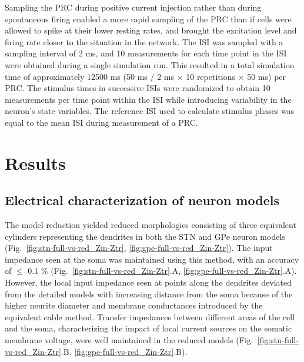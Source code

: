 Sampling the PRC during positive current injection rather than during spontaneous
firing enabled a more rapid sampling of the PRC than if cells were allowed to spike
at their lower resting rates, and brought the excitation level and firing rate closer
to the situation in the network.
%
The ISI was sampled with a sampling interval of 2 ms, and 10 measurements for each time
point in the ISI were obtained during a single simulation run.
This resulted in a total simulation time of approximately 12500 ms
(50 ms / 2 ms $\times$ 10 repetitions $\times$ 50 ms) per PRC. The stimulus times in
successive ISIs were randomized to obtain 10 measurements per
time point within the ISI while introducing variability in the neuron's state variables.
The reference ISI used to calculate stimulus phases was equal to the mean ISI
during measurement of a PRC.
%
%



%
%
%
\section{Results}

%
%
%
%

%
%
%
%
%
%
%

%
%
%
\subsection{Electrical characterization of neuron models}
%

%
%
%
%
%

%
%
%
%
%
%
%
%

The model reduction yielded reduced morphologies consisting of three equivalent
cylinders representing the dendrites in both the STN and GPe neuron models
(Fig.~\ref{fig:stn-full-vs-red_Zin-Ztr}, \ref{fig:gpe-full-vs-red_Zin-Ztr}).
The input impedance seen at the soma was maintained using this method,
with an accuracy of $\leq$ 0.1 \% (Fig.~\ref{fig:stn-full-vs-red_Zin-Ztr}.A, \ref{fig:gpe-full-vs-red_Zin-Ztr}.A).
However, the local input impedance seen at points along the dendrites deviated from the
detailed models with increasing distance
from the soma because of the higher neurite diameter and membrane conductances introduced by
the equivalent cable method. Transfer impedances between different areas of the cell and the soma,
characterizing the impact of local current sources on the somatic membrane voltage, were well
maintained in the reduced models (Fig.~\ref{fig:stn-full-vs-red_Zin-Ztr}.B, \ref{fig:gpe-full-vs-red_Zin-Ztr}.B).

